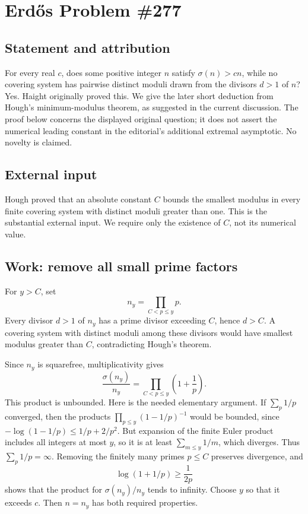 \section{Erd\H{o}s Problem \#277}
\subsection{Statement and attribution}
For every real $c$, does some positive integer $n$ satisfy $\sigma(n)>cn$, while no covering system has pairwise distinct moduli drawn from the divisors $d>1$ of $n$? Yes. Haight originally proved this. We give the later short deduction from Hough's minimum-modulus theorem, as suggested in the current discussion. The proof below concerns the displayed original question; it does not assert the numerical leading constant in the editorial's additional extremal asymptotic. No novelty is claimed.

\subsection{External input}
Hough proved that an absolute constant $C$ bounds the smallest modulus in every finite covering system with distinct moduli greater than one. This is the substantial external input. We require only the existence of $C$, not its numerical value.

\subsection{Work: remove all small prime factors}
For $y>C$, set
\[
 n_y=\prod_{C<p\le y}p.
\]
Every divisor $d>1$ of $n_y$ has a prime divisor exceeding $C$, hence $d>C$. A covering system with distinct moduli among these divisors would have smallest modulus greater than $C$, contradicting Hough's theorem.

Since $n_y$ is squarefree, multiplicativity gives
\[
 \frac{\sigma(n_y)}{n_y}=\prod_{C<p\le y}\left(1+\frac1p\right).
\]
This product is unbounded. Here is the needed elementary argument. If $\sum_p1/p$ converged, then the products $\prod_{p\le y}(1-1/p)^{-1}$ would be bounded, since
$-\log(1-1/p)\le1/p+2/p^2$. But expansion of the finite Euler product includes all integers at most $y$, so it is at least $\sum_{m\le y}1/m$, which diverges. Thus $\sum_p1/p=\infty$.
Removing the finitely many primes $p\le C$ preserves divergence, and
\[
 \log(1+1/p)\ge\frac1{2p}
\]
shows that the product for $\sigma(n_y)/n_y$ tends to infinity. Choose $y$ so that it exceeds $c$. Then $n=n_y$ has both required properties.

